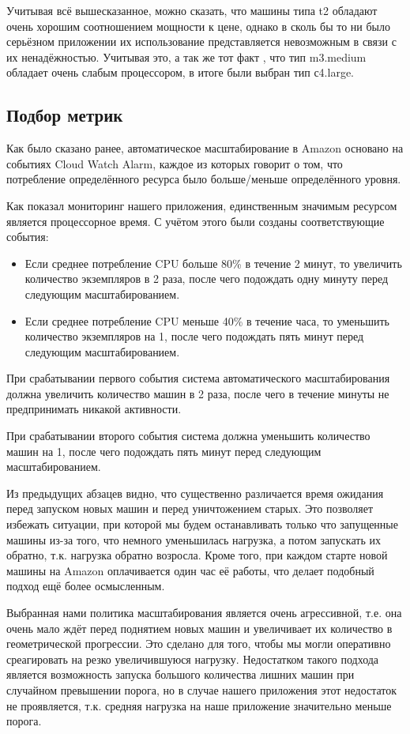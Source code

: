 	Учитывая всё вышесказанное, можно сказать, что машины типа t2 обладают очень хорошим соотношением мощности к цене, однако в сколь бы то ни было серьёзном приложении их использование представляется невозможным в связи с их ненадёжностью. Учитывая это, а так же тот факт , что тип m3.medium обладает очень слабым процессором, в итоге были выбран тип с4.large.
\subsection{Подбор метрик}
	Как было сказано ранее, автоматическое масштабирование в Amazon основано на событиях Cloud Watch Alarm, каждое из которых говорит о том, что потребление определённого ресурса было больше/меньше определённого уровня.
	
	Как показал мониторинг нашего приложения, единственным значимым ресурсом является процессорное время. С учётом этого были созданы соответствующие события:
\begin{itemize}
	\item Если среднее потребление CPU больше 80\% в течение 2 минут, то увеличить количество экземпляров в 2 раза, после чего подождать одну минуту перед следующим масштабированием.
	\item Если среднее потребление CPU меньше 40\% в течение часа, то уменьшить количество экземпляров на 1, после чего подождать пять минут перед следующим масштабированием.
\end{itemize}

	При срабатывании первого события система автоматического масштабирования должна увеличить количество машин в 2 раза, после чего в течение минуты не предпринимать никакой активности.
	
	При срабатывании второго события система должна уменьшить количество машин на 1, после чего подождать пять минут перед следующим масштабированием.

	Из предыдущих абзацев видно, что существенно различается время ожидания перед запуском новых машин и перед уничтожением старых. Это позволяет избежать ситуации, при которой мы будем останавливать только что запущенные машины из-за того, что немного уменьшилась нагрузка, а потом запускать их обратно, т.к. нагрузка обратно возросла. Кроме того, при каждом старте новой машины на Amazon оплачивается один час её работы, что делает подобный подход ещё более осмысленным.
	
	Выбранная нами политика масштабирования является очень агрессивной, т.е. она очень мало ждёт перед поднятием новых машин и увеличивает их количество в геометрической прогрессии. Это сделано для того, чтобы мы могли оперативно среагировать на резко увеличившуюся нагрузку. Недостатком такого подхода является возможность запуска большого количества лишних машин при случайном превышении порога, но в случае нашего приложения этот недостаток не проявляется, т.к. средняя нагрузка на наше приложение значительно меньше порога.
	

